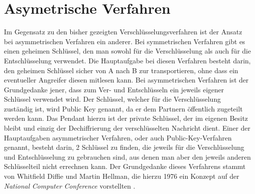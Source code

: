 \documentclass[10pt, a4paper,headsepline]{scrreprt}
\begin{document}
\section{Asymetrische Verfahren}
Im Gegensatz zu den bisher gezeigten Verschlüsselungsverfahren ist der Ansatz bei asymmetrischen Verfahren ein anderer. Bei symmetrischen Verfahren gibt es einen geheimen Schlüssel, den man sowohl für die Verschlüsselung als auch für die Entschlüsselung verwendet. Die Hauptaufgabe bei diesen Verfahren besteht darin, den geheimen Schlüssel sicher von A nach B zur transportieren, ohne dass ein eventueller Angreifer diesen mitlesen kann. Bei asymmetrischen Verfahren ist der Grundgedanke jener, dass zum Ver- und Entschlüsseln ein jeweils eigener Schlüssel verwendet wird. Der Schlüssel, welcher für die Verschlüsselung zuständig ist, wird Public Key genannt, da er dem Partnern öffentlich zugeteilt werden kann. Das Pendant hierzu ist der private Schlüssel, der im eigenen Besitz bleibt und einzig der Dechiffrierung der verschlüsselten Nachricht dient. Einer der Hauptaufgaben asymmetrischer Verfahren, oder auch Public-Key-Verfahren genannt, besteht darin, 2 Schlüssel zu finden, die jeweils für die Verschlüsselung und Entschlüsselung zu gebrauchen sind, aus denen man aber den jeweils anderen Schlüsselteil nicht errechnen kann. Der Grundgedanke dieses Verfahrens stammt von Whitfield Diffie und Martin Hellman, die hierzu 1976 ein Konzept auf der \textit{National Computer Conference} vorstellten \citep[S. 525]{book:angewandte-krypto}.
\end{document}
